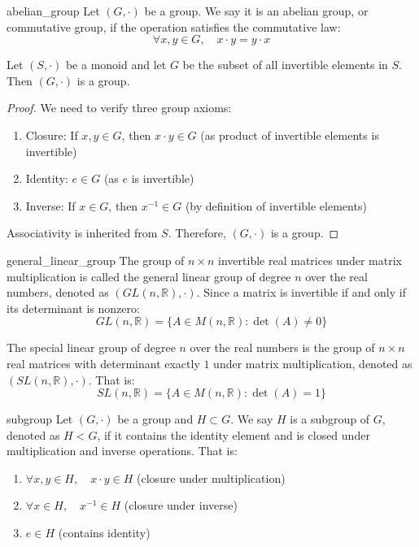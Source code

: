\documentclass[11pt,lang=en]{elegantbook}
\begin{document}
\begin{definition}{abelian_group}
  Let $(G,\cdot)$ be a group. We say it is an abelian group, or commutative group, if the operation satisfies the commutative law:
  \[
    \forall x,y \in G, \quad x \cdot y = y \cdot x
  \]
\end{definition}

\begin{lemma}
  Let $(S,\cdot)$ be a monoid and let $G$ be the subset of all invertible elements in $S$. Then $(G,\cdot)$ is a group.
\end{lemma}

\begin{proof}
  We need to verify three group axioms:
  \begin{enumerate}
    \item Closure: If $x,y \in G$, then $x \cdot y \in G$ (as product of invertible elements is invertible)
    \item Identity: $e \in G$ (as $e$ is invertible)
    \item Inverse: If $x \in G$, then $x^{-1} \in G$ (by definition of invertible elements)
  \end{enumerate}
  Associativity is inherited from $S$. Therefore, $(G,\cdot)$ is a group.
\end{proof}

\begin{definition}{general_linear_group}
  The group of $n \times n$ invertible real matrices under matrix multiplication is called the general linear group of degree $n$ over the real numbers, denoted as $(GL(n,\mathbb{R}),\cdot)$. Since a matrix is invertible if and only if its determinant is nonzero:
  \[
    GL(n,\mathbb{R}) = \{ A \in M(n,\mathbb{R}) : \det(A) \neq 0 \}
  \]
\end{definition}

\begin{definition}
  The special linear group of degree $n$ over the real numbers is the group of $n \times n$ real matrices with determinant exactly $1$ under matrix multiplication, denoted as $(SL(n,\mathbb{R}),\cdot)$. That is:
  \[
    SL(n,\mathbb{R}) = \{ A \in M(n,\mathbb{R}) : \det(A) = 1 \}
  \]
\end{definition}

\begin{definition}[Subgroup]{subgroup}
  Let $(G,\cdot)$ be a group and $H \subset G$. We say $H$ is a subgroup of $G$, denoted as $H < G$, if it contains the identity element and is closed under multiplication and inverse operations. That is:
  \begin{enumerate}
    \item $\forall x,y \in H, \quad x \cdot y \in H$ \quad (closure under multiplication)
    \item $\forall x \in H, \quad x^{-1} \in H$ \quad (closure under inverse)
    \item $e \in H$ \quad (contains identity)
  \end{enumerate}
\end{definition}
\end{document}
